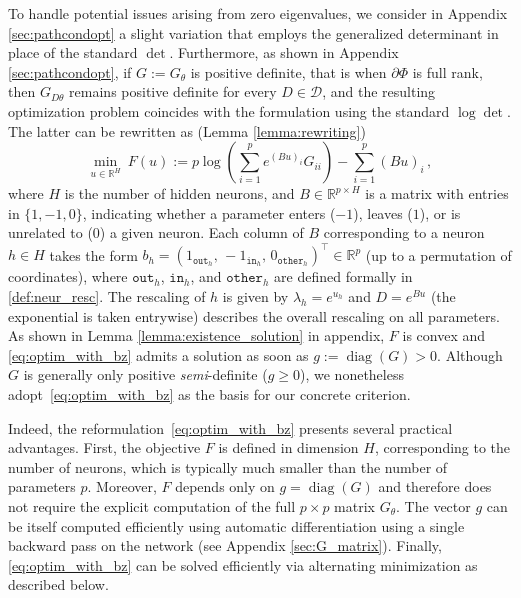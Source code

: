 \documentclass{article}
\theoremstyle{plain}
\theoremstyle{definition}
\theoremstyle{remark}
\def\Dcal{\mathcal{D}}
\def\diag{\text{diag}}
\def\diag{\operatorname{diag}}
\def\R{{\mathbb{R}}}
\def\Dcal{{\mathcal{D}}}
\begin{document}
{To handle potential issues arising from zero eigenvalues, we consider in Appendix \ref{sec:pathcondopt} a slight variation that employs the generalized determinant in place of the standard $\det$. Furthermore, as shown in Appendix \ref{sec:pathcondopt},
if $G := G_{\theta}$ is positive definite, that is when $\partial \Phi$ is full rank, 
then $G_{D\theta}$ remains positive definite for every $D \in \Dcal$, 
and the resulting optimization problem coincides with the formulation using the standard $\log\det$.  
The latter can be rewritten as (Lemma \ref{lemma:rewriting})
\begin{equation}
\label{eq:optim_with_bz}
\min_{u \in \R^{H}} \ F(u) := p\log(\sum_{i=1}^{p} e^{(Bu)_i} G_{ii}) - \sum_{i=1}^{p} (Bu)_i\,,
\end{equation}
where $H$ is the number of hidden neurons, and $B \in \R^{p \times H}$ is a matrix with entries in $\{1,-1,0\}$, indicating whether a parameter enters ($-1$), 
leaves ($1$), or is unrelated to ($0$) a given neuron.
Each column of $B$ corresponding to a neuron $h \in H$ takes the form
$b_h = (1_{\texttt{out}_h},\, -1_{\texttt{in}_h},\, 0_{\texttt{other}_h})^\top \in \R^{p}$
(up to a permutation of coordinates), where $\texttt{out}_h$, $\texttt{in}_h$, and $\texttt{other}_h$
are defined formally in \cref{def:neur_resc}.
The rescaling of $h$ is given by $\lambda_{h}= e^{u_{h}}$ and 
$D = e^{Bu}$ (the exponential is taken entrywise) describes the overall rescaling on all parameters. 
As shown in Lemma \ref{lemma:existence_solution} in appendix, $F$ is convex
and \eqref{eq:optim_with_bz} admits a solution as soon as $g := \diag(G) > 0$. Although $G$ is generally only positive \emph{semi}-definite ($g \geq 0$),
we nonetheless adopt~\eqref{eq:optim_with_bz} as the basis for our concrete criterion.

Indeed, the reformulation~\eqref{eq:optim_with_bz} presents several practical advantages. 
First, the objective $F$ is defined in dimension $H$, corresponding to the number of neurons, 
which is typically much smaller than the number of parameters $p$. Moreover, 
$F$ depends only on $g=\diag(G)$ and therefore does not require the explicit computation of the full $p \times p$ matrix 
$G_{\theta}$. The vector $g$ can be itself computed efficiently using automatic differentiation 
using a single backward pass on the network (see Appendix \ref{sec:G_matrix}). 
Finally, \eqref{eq:optim_with_bz} 
can be solved efficiently via alternating minimization as described below.

}
\end{document}
